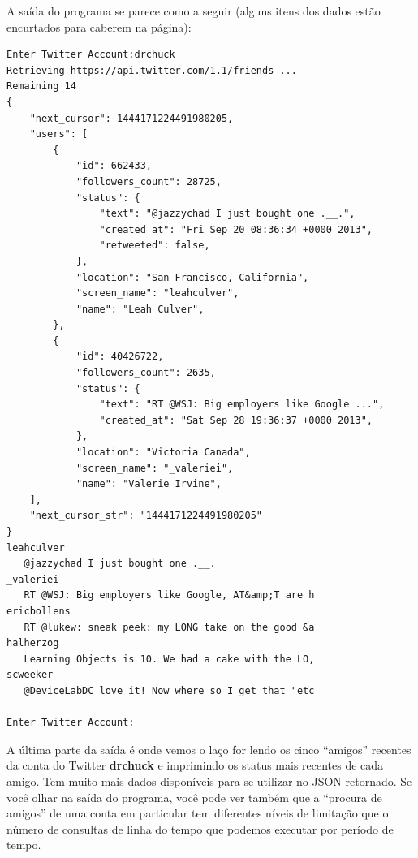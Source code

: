 A saída do programa se parece como a seguir (alguns itens dos dados
estão encurtados para caberem na página):

\beforeverb
\begin{verbatim}
Enter Twitter Account:drchuck
Retrieving https://api.twitter.com/1.1/friends ...
Remaining 14
{
    "next_cursor": 1444171224491980205, 
    "users": [
        {
            "id": 662433, 
            "followers_count": 28725, 
            "status": {
                "text": "@jazzychad I just bought one .__.", 
                "created_at": "Fri Sep 20 08:36:34 +0000 2013", 
                "retweeted": false, 
            }, 
            "location": "San Francisco, California", 
            "screen_name": "leahculver", 
            "name": "Leah Culver", 
        }, 
        {
            "id": 40426722, 
            "followers_count": 2635, 
            "status": {
                "text": "RT @WSJ: Big employers like Google ...", 
                "created_at": "Sat Sep 28 19:36:37 +0000 2013", 
            }, 
            "location": "Victoria Canada", 
            "screen_name": "_valeriei", 
            "name": "Valerie Irvine", 
    ], 
    "next_cursor_str": "1444171224491980205"
}
leahculver
   @jazzychad I just bought one .__.
_valeriei
   RT @WSJ: Big employers like Google, AT&amp;T are h
ericbollens
   RT @lukew: sneak peek: my LONG take on the good &a
halherzog
   Learning Objects is 10. We had a cake with the LO,
scweeker
   @DeviceLabDC love it! Now where so I get that "etc

Enter Twitter Account:
\end{verbatim}
\afterverb

A última parte da saída é onde vemos o laço for lendo os
cinco ``amigos'' recentes da conta do Twitter {\bf drchuck} e
imprimindo os status mais recentes de cada amigo. Tem muito mais dados
disponíveis para se utilizar no JSON retornado. Se você olhar na 
saída do programa, você pode ver também que a ``procura de amigos'' de
uma conta em particular tem diferentes níveis de limitação que 
o número de consultas de linha do tempo que podemos executar por 
período de tempo.

